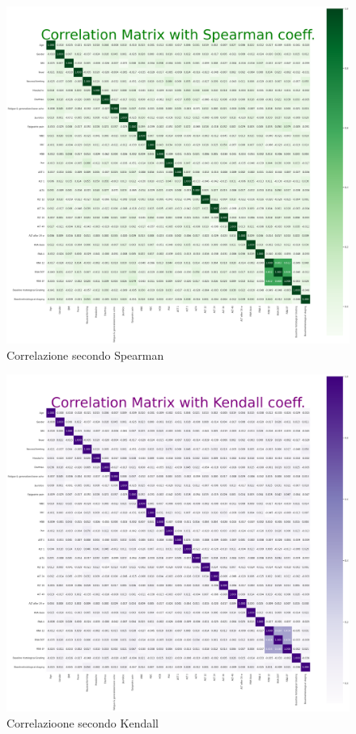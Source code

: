 \documentclass[italian,12pt,a4paper]{article}
\begin{document}
    
    \begin{figure}[htbp]
        \centering
		\includegraphics[width=1\textwidth]{corrMatrixSpear2.png}
         \caption{Correlazione secondo Spearman}
        \label{fig:SpearmanMatrix}
	\end{figure}

    
    \begin{figure}[htbp]
        \centering
		\includegraphics[width=1\textwidth]{corrMatrixKen3.png}
        \caption{Correlazioone secondo Kendall}
        \label{fig:KendallMatrix}
	\end{figure}
\end{document}
